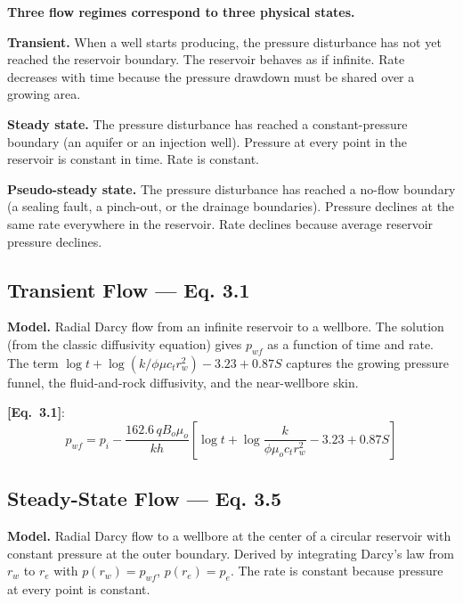 \documentclass[11pt,a4paper,openany]{book}
\newcommand{\eqrefbook}[1]{\textcolor{blue!60!black}{\textbf{[Eq.~#1]}}}
\begin{document}
\begin{theory}
\textbf{Three flow regimes correspond to three physical states.}

\textbf{Transient.} When a well starts producing, the pressure
disturbance has not yet reached the reservoir boundary. The reservoir
behaves as if infinite. Rate decreases with time because the pressure
drawdown must be shared over a growing area.

\textbf{Steady state.} The pressure disturbance has reached a
constant-pressure boundary (an aquifer or an injection well). Pressure
at every point in the reservoir is constant in time. Rate is constant.

\textbf{Pseudo-steady state.} The pressure disturbance has reached a
no-flow boundary (a sealing fault, a pinch-out, or the drainage
boundaries). Pressure declines at the same rate everywhere in the
reservoir. Rate declines because average reservoir pressure declines.
\end{theory}

\subsection{Transient Flow — Eq. 3.1}

\begin{theory}
\textbf{Model.} Radial Darcy flow from an infinite reservoir to a
wellbore. The solution (from the classic diffusivity equation) gives
$p_{wf}$ as a function of time and rate. The term
$\log t + \log(k/\phi\mu c_t r_w^2) - 3.23 + 0.87S$ captures the
growing pressure funnel, the fluid-and-rock diffusivity, and the
near-wellbore skin.
\end{theory}

\eqrefbook{3.1}:
\begin{equation}
  p_{wf} = p_i - \frac{162.6\,q B_o\mu_o}{kh}\left[
    \log t + \log\frac{k}{\phi\mu_o c_t r_w^2} - 3.23 + 0.87S
  \right]
\end{equation}

\subsection{Steady-State Flow — Eq. 3.5}

\begin{theory}
\textbf{Model.} Radial Darcy flow to a wellbore at the center of a
circular reservoir with constant pressure at the outer boundary.
Derived by integrating Darcy's law from $r_w$ to $r_e$ with
$p(r_w) = p_{wf}$, $p(r_e) = p_e$. The rate is constant because
pressure at every point is constant.
\end{theory}
\end{document}
